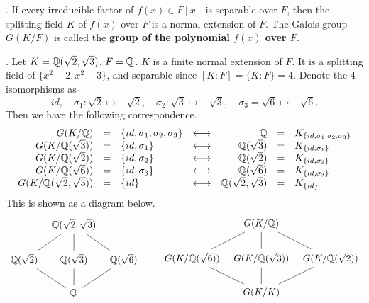\thm. If every irreducible factor of \(f(x) \in F[x]\) is separable over \(F\), then the splitting field \(K\) of \(f(x)\) over \(F\) is a normal extension of \(F\). The Galois group \(G(K/F)\) is called the \textbf{group of the polynomial \(f(x)\) over \(F\)}.

\ex. Let \(K = \mathbb{Q}(\sqrt{2}, \sqrt{3})\), \(F = \mathbb{Q}\). \(K\) is a finite normal extension of \(F\). It is a splitting field of \(\{x^2 - 2, x^2 - 3\}\), and separable since \([K : F] = \{K : F\} = 4\). Denote the \(4\) isomorphisms as
\[
    id, \quad \sigma_1 : \sqrt{2} \mapsto -\sqrt{2}, \quad \sigma_2 : \sqrt{3} \mapsto -\sqrt{3}, \quad \sigma_3 = \sqrt{6} \mapsto -\sqrt{6}.
\]
Then we have the following correspondence.
\[
    \begin{array}{rclcrcl}
        G(K/\mathbb{Q})            & = & \{id, \sigma_1, \sigma_2, \sigma_3\} & \longleftrightarrow & \mathbb{Q}                     & = & K_{\{id, \sigma_1, \sigma_2, \sigma_3\}} \\
        G(K/\mathbb{Q}(\sqrt{3})) & = & \{id, \sigma_1\}                     & \longleftrightarrow & \mathbb{Q}(\sqrt{3})           & = & K_{\{id, \sigma_1\}}                     \\
        G(K/\mathbb{Q}(\sqrt{2})) & = & \{id, \sigma_2\}                     & \longleftrightarrow & \mathbb{Q}(\sqrt{2})           & = & K_{\{id, \sigma_2\}}                     \\
        G(K/\mathbb{Q}(\sqrt{6})) & = & \{id, \sigma_3\}                     & \longleftrightarrow & \mathbb{Q}(\sqrt{6})           & = & K_{\{id, \sigma_3\}}                     \\
        G(K/\mathbb{Q}(\sqrt{2}, \sqrt{3}))           & = & \{id\}                               & \longleftrightarrow & \mathbb{Q}(\sqrt{2}, \sqrt{3}) & = & K_{\{id\}}
    \end{array}
\]
This is shown as a diagram below.
\[
    \begin{tikzcd}[column sep=tiny]
        & \Q(\sqrt{2}, \sqrt{3}) \arrow[dash]{dl} \arrow[dash]{d} \arrow[dash]{dr} & \\
        \Q(\sqrt{2}) & \Q(\sqrt{3}) & \Q(\sqrt{6}) \\
        & \Q \arrow[dash]{ul} \arrow[dash]{u} \arrow[dash]{ur} &
    \end{tikzcd} \qquad
    \begin{tikzcd}[column sep=tiny]
        & G(K/\Q) \arrow[dash]{dl} \arrow[dash]{d} \arrow[dash]{dr} & \\
        G(K/\Q(\sqrt{6})) & G(K/\Q(\sqrt{3})) & G(K/\Q(\sqrt{2}))   \\
        & G(K/K) \arrow[dash]{ul} \arrow[dash]{u} \arrow[dash]{ur} &
    \end{tikzcd}
\]

